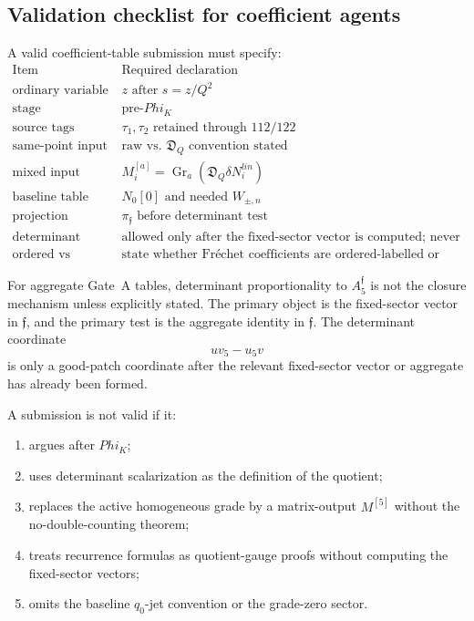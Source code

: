 \documentclass[11pt,a4paper]{amsart}
\def\Phi{Phi}%
\def\lin{lin}%
\theoremstyle{plain}
\theoremstyle{definition}
\newcommand{\lin}{\mathrm{lin}}
\begin{document}
\subsection{Validation checklist for coefficient agents}
\label{app:validation-checklist-coefficient-agents}

A valid coefficient-table submission must specify:
\[
\begin{array}{c|c}
\text{Item} & \text{Required declaration}
\\
\hline
\text{ordinary variable} & z\text{ after }s=z/Q^2
\\
\text{stage} & \text{pre-}\Phi_K
\\
\text{source tags} & \tau_1,\tau_2\text{ retained through }112/122
\\
\text{same-point input} & \text{raw vs. }\mathfrak D_Q\text{ convention stated}
\\
\text{mixed input} & M_i^{[a]}=\operatorname{Gr}_a(\mathfrak D_Q\delta N_i^{\lin})
\\
\text{baseline table} & N_0[0]\text{ and needed }W_{\pm,n}
\\
\text{projection} & \pi_{\mathfrak f}\text{ before determinant test}
\\
\text{determinant coordinate}
&
\text{allowed only after the fixed-sector vector is computed; never as the definition}
\\
\text{ordered vs symmetric source slots}
&
\text{state whether Fr\'echet coefficients are ordered-labelled or
symmetric;
if ordered, include all labelled permutations before applying aggregate
transpose cancellation}
\end{array}
\]

For aggregate Gate~A tables, determinant proportionality to
\(A_5^{\mathfrak f}\) is not the closure mechanism unless explicitly
stated.  The primary object is the fixed-sector vector in \(\mathfrak f\),
and the primary test is the aggregate identity in \(\mathfrak f\).  The
determinant coordinate
\[
uv_5-u_5v
\]
is only a good-patch coordinate after the relevant fixed-sector vector or
aggregate has already been formed.

A submission is not valid if it:
\begin{enumerate}
\item argues after \(\Phi_K\);
\item uses determinant scalarization as the definition of the quotient;
\item replaces the active homogeneous grade by a matrix-output \(M^{[5]}\)
without the no-double-counting theorem;
\item treats recurrence formulas as quotient-gauge proofs without
computing the fixed-sector vectors;
\item omits the baseline \(q_0\)-jet convention or the grade-zero sector.
\end{enumerate}
\end{document}
